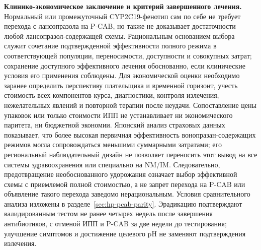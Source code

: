 \documentclass[11pt,a4paper,notitlepage]{report}
\newcommand{\src}[1]{\unskip\space\cite{#1}}
\begin{document}
\textbf{Клинико-экономическое заключение и критерий завершенного лечения.} Нормальный или промежуточный CYP2C19-фенотип сам по себе не требует перехода с лансопразола на P-CAB, но также не доказывает достаточности любой лансопразол-содержащей схемы. Рациональным основанием выбора служит сочетание подтвержденной эффективности полного режима в соответствующей популяции, переносимости, доступности и совокупных затрат; сохранение доступного эффективного лечения обоснованно, если клинические условия его применения соблюдены.\src{cpic,acghp,jhp} Для экономической оценки необходимо заранее определить перспективу плательщика и временной горизонт, учесть стоимость всех компонентов курса, диагностики, контроля излечения, нежелательных явлений и повторной терапии после неудачи. Сопоставление цены упаковок или только стоимости ИПП не устанавливает ни экономического паритета, ни бюджетной экономии. Японский анализ страховых данных показывает, что более высокая первичная эффективность вонопразан-содержащих режимов могла сопровождаться меньшими суммарными затратами; его региональный наблюдательный дизайн не позволяет переносить этот вывод на все системы здравоохранения или специально на NM/IM.\src{hpcost2021} Следовательно, предотвращение необоснованного удорожания означает выбор эффективной схемы с приемлемой полной стоимостью, а не запрет перехода на P-CAB или объявление такого перехода заведомо нерациональным. Условия сравнительного анализа изложены в разделе~\ref{sec:hp-pcab-parity}. Эрадикацию подтверждают валидированным тестом не ранее четырех недель после завершения антибиотиков, с отменой ИПП и P-CAB за две недели до тестирования; улучшение симптомов и достижение целевого pH не заменяют подтверждения излечения.\src{acghp,hpcost2021}
\end{document}
